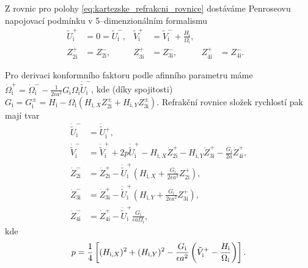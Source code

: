 Z rovnic pro polohy \eqref{eq:kartezske_refrakcni_rovnice} dostáváme Penroseovu napojovací podmínku v 5--dimenzionálním formalismu
\begin{align}
        \tilde{U}^{+}_\mathrm{i} &= 0 = \tilde{U}^{-}_\mathrm{i}, &
        \tilde{V}^{+}_\mathrm{i} &= \tilde{V}^{-}_\mathrm{i} + \frac{H_\mathrm{i}}{\Omega_\mathrm{i}}, \nonumber \\
        Z^{+}_{2\mathrm{i}} &= Z^{-}_{2\mathrm{i}}, &
        Z^{+}_{3\mathrm{i}} &= Z^{-}_{3\mathrm{i}}, &
        Z^{+}_{4\mathrm{i}} &= Z^{-}_{4\mathrm{i}}.  &
\end{align}

Pro derivaci konformního faktoru podle afinního parametru máme
$\dot{\Omega}_{\mathrm{i}}^{+} = \dot{\Omega}^{-}_{\mathrm{i}} - \frac{1}{2 \epsilon a^2} G_{\mathrm{i}} \Omega_{\mathrm{i}}  \dot{\tilde{U}}^{-}_{\mathrm{i}}$, kde (díky spojitosti) $G_{\mathrm{i}}=G_{\mathrm{i}}^{\pm} = H_{\mathrm{i}} - \Omega_{\mathrm{i}}(H_{\mathrm{i}, X} Z_{2\mathrm{i}}^{\pm} + H_{\mathrm{i}, Y}Z_{3\mathrm{i}}^{\pm})$.
Refrakční rovnice složek rychlostí pak mají tvar
\begin{equation}
    \begin{split}
        \dot{\tilde{U}}^{-}_{\mathrm{i}} &= \dot{\tilde{U}}{}^{+}_{\mathrm{i}}, \\
        \dot{\tilde{V}}^{-}_{\mathrm{i}} &= \dot{\tilde{V}}^{+}_{\mathrm{i}} + 2 p \dot{\tilde{U}}^{+}_{\mathrm{i}} - H_{\mathrm{i}, X} \dot Z_{2\mathrm{i}}^{+} - H_{\mathrm{i}, Y} \dot Z_{3\mathrm{i}}^{+} - \frac{G_\mathrm{i}}{2a} \dot Z_{4\mathrm{i}}^{+}, \\
        \dot Z_{2\mathrm{i}}^{-} &= \dot Z_{2\mathrm{i}}^{+} - \dot{\tilde{U}}^{+}_{\mathrm{i}} \left( H_{\mathrm{i},X} + \frac{G_{\mathrm{i}}}{2 \epsilon a^2} Z_{2\mathrm{i}}^{+}\right), \\
        \dot Z_{3\mathrm{i}}^{-} &= \dot Z_{3\mathrm{i}}^{+} - \dot{\tilde{U}}^{+}_{\mathrm{i}} \left( H_{\mathrm{i},Y} + \frac{G_{\mathrm{i}}}{2 \epsilon a^2} Z_{3\mathrm{i}}^{+}\right), \\
        \dot Z_{4\mathrm{i}}^{-} &= \dot Z_{4\mathrm{i}}^{+} - \dot{\tilde{U}}^{+}_{\mathrm{i}} \frac{G_{\mathrm{i}}}{\epsilon a \Omega_{\mathrm{i}}},
    \end{split}
\end{equation}
kde
\begin{equation}
    p = \frac{1}{4} \left[(H_{\mathrm{i}, X})^2 + (H_{\mathrm{i}, Y})^2 - \frac{G_{\mathrm{i}}}{\epsilon a^2} \left(\tilde{V}_{\mathrm{i}}^+ - \frac{H_{\mathrm{i}}}{\Omega_{\mathrm{i}}}\right)\right].
\end{equation}

